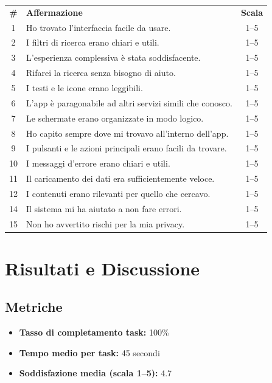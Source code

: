 \begin{table}[h!]
\centering
\begin{tabular}{clc}
\textbf{\#} & \textbf{Affermazione} & \textbf{Scala} \\
1 & Ho trovato l’interfaccia facile da usare. & 1–5 \\
2 & I filtri di ricerca erano chiari e utili. & 1–5 \\
3 & L’esperienza complessiva è stata soddisfacente. & 1–5 \\
4 & Rifarei la ricerca senza bisogno di aiuto. & 1–5 \\
5 & I testi e le icone erano leggibili. & 1–5 \\
6 & L'app è paragonabile ad altri servizi simili che conosco. & 1–5 \\
7 & Le schermate erano organizzate in modo logico. & 1–5 \\
8 & Ho capito sempre dove mi trovavo all’interno dell’app. & 1–5 \\
9 & I pulsanti e le azioni principali erano facili da trovare. & 1–5 \\
10 & I messaggi d’errore erano chiari e utili. & 1–5 \\
11 & Il caricamento dei dati era sufficientemente veloce. & 1–5 \\
12 & I contenuti erano rilevanti per quello che cercavo. & 1–5 \\
14 & Il sistema mi ha aiutato a non fare errori. & 1–5 \\
15 & Non ho avvertito rischi per la mia privacy. & 1–5 \\
\end{tabular}
\end{table}

\section{Risultati e Discussione}

\subsection{Metriche}

\begin{itemize}
  \item \textbf{Tasso di completamento task:} 100\%
  \item \textbf{Tempo medio per task:} 45 secondi
  \item \textbf{Soddisfazione media (scala 1–5):} 4.7
\end{itemize}

